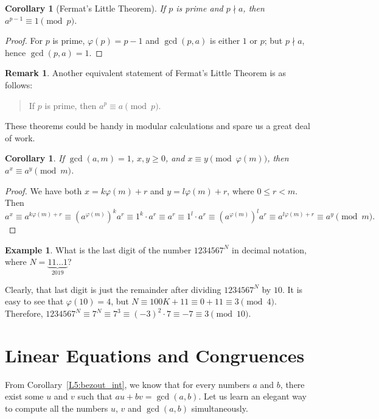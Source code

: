 \documentclass[12pt,notitlepage]{article}
\theoremstyle{plain}
\newtheorem{corr}[thm]{Corollary}
\theoremstyle{definition}
\newtheorem{exm}[thm]{Example}
\newtheorem{rem}[thm]{Remark}
\theoremstyle{plain}
\renewcommand{\phi}{\varphi}
\newcommand{\1}{\mathbf{1}}
\newcommand{\0}{\mathbf{0}}
\newcommand{\ndvd}{\mathop{\nmid}}
\begin{document}
\begin{corr}[Fermat's Little Theorem]
If $p$ is prime and $p \ndvd a$, then $a^{p - 1} \equiv 1 \pmod p$.
\end{corr}
\begin{proof}
For $p$ is prime, $\phi(p) = p - 1$ and $\gcd(p, a)$ is either $1$ or $p$; but $p \ndvd a$, hence $\gcd(p,a) = 1$.
\end{proof}
\begin{rem}
Another equivalent statement of Fermat's Little Theorem is as follows:
\begin{quote}
 If $p$ is prime, then $a^p \equiv a \pmod p$.
\end{quote}
\end{rem}
\noindent  These theorems could be handy in modular calculations and spare us a great deal of work.
\begin{corr}
If $\gcd(a, m) = 1$, $x, y \geq 0$, and $x \equiv y \pmod {\phi(m)}$, then $a^x \equiv a^y \pmod m$.
\end{corr}
\begin{proof}
We have both $x = k\phi(m) + r$ and $y = l\phi(m) + r$, where $0 \leq r < m$. Then
$$a^x \equiv a^{k\phi(m) + r} \equiv (a^{\phi(m)})^k a^r \equiv 1^k \cdot a^r \equiv a^r \equiv 1^l \cdot a^r \equiv (a^{\phi(m)})^l a^r \equiv a^{l\phi(m) + r} \equiv a^y \pmod m.$$
\end{proof}
\begin{exm}
What is the last digit of the number $1234567^N$ in decimal notation, where $N = {\underbrace{11\ldots1}_{2019}}$?

Clearly, that last digit is just the remainder after dividing $1234567^N$ by $10$. It is easy to see that $\phi(10) = 4$, but $N \equiv 100K + 11 \equiv 0 + 11 \equiv 3 \pmod 4$. Therefore, $1234567^N \equiv 7^N \equiv 7^3 \equiv (-3)^2 \cdot 7 \equiv -7 \equiv 3 \pmod{10}$.
\end{exm}


\newpage
\section{Linear Equations and Congruences}

From Corollary~\ref{L5:bezout_int}, we know that for every numbers $a$ and $b$, there exist some $u$ and $v$ such that $a u + b v = \gcd(a,b)$. Let us learn an elegant way to compute all the numbers $u$, $v$ and $\gcd(a,b)$ simultaneously.
\end{document}
